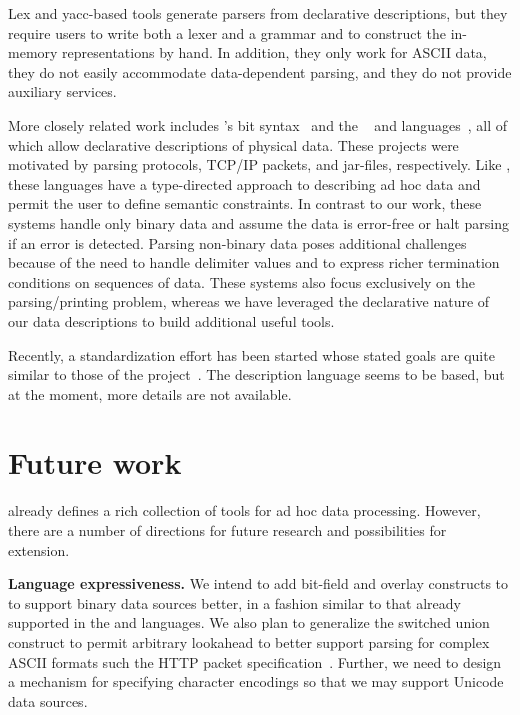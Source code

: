 \documentclass{sig-alternate}
\begin{document}
Lex and yacc-based tools generate parsers from declarative descriptions, but 
they require users to write both a lexer and a grammar and to construct the in-memory representations by hand.  In addition, they only work for ASCII data,  they do not easily accommodate data-dependent parsing, and they do not provide auxiliary services. 

More closely related work includes \erlang{}'s bit syntax~\cite{erlang} and
the \packettypes{}~\cite{sigcomm00} and
\datascript{} languages~\cite{gpce02}, 
all of which allow declarative descriptions of physical data.  These projects were motivated by parsing protocols,
\textsc{TCP/IP} packets, and \java{} jar-files, respectively.  Like
\pads{}, these languages have a type-directed approach to
describing ad hoc data and permit the user to define semantic constraints.
In contrast to our
work, these systems handle only binary data and assume the data is
error-free or halt parsing if an error is detected. 
Parsing non-binary data poses additional challenges because of the need
to handle delimiter values and to express richer termination conditions
on sequences of data. These systems also
focus exclusively on the parsing/printing problem, whereas we have 
leveraged the declarative nature of
our data descriptions to build additional useful tools.


Recently, a standardization effort has been started whose stated goals are quite similar to those of the \pads{} project~\cite{dfdl}. The description
language seems to be \xml{} based, but at the moment, more details are 
not available.

\section{Future work}
\pads{} already defines a rich collection of tools for ad hoc data processing.
However, there are a number of directions for future research and possibilities for extension. 

\textbf{Language expressiveness.}  
We intend to add bit-field 
and overlay constructs to \pads{} to support binary data sources better,
in a fashion similar to that already supported in the \datascript{} and \packettypes{} languages.
We also plan to generalize the switched union construct to permit arbitrary lookahead to better support
parsing for complex ASCII formats such the HTTP packet specification~\cite{http}.  Further, we need to design a mechanism
for specifying character encodings so that we may support 
Unicode~\cite{unicode} data sources.
\end{document}
